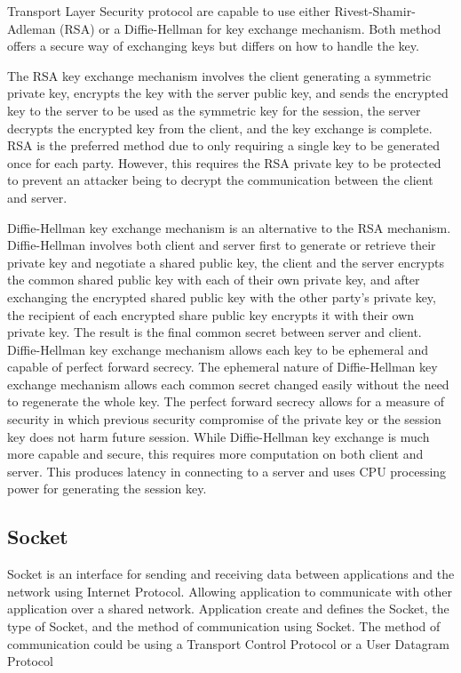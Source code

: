 Transport Layer Security protocol are capable to use either Rivest-Shamir-Adleman (RSA) or a Diffie-Hellman for key exchange mechanism. Both method offers a secure way of exchanging keys but differs on how to handle the key.

The RSA key exchange mechanism involves the client generating a symmetric private key, encrypts the key with the server public key, and sends the encrypted key to the server to be used as the symmetric key for the session, the server decrypts the encrypted key from the client, and the key exchange is complete. RSA is the preferred method due to only requiring a single key to be generated once for each party. However, this requires the RSA private key to be protected to prevent an attacker being to decrypt the communication between the client and server.



Diffie-Hellman key exchange mechanism is an alternative to the RSA mechanism. Diffie-Hellman involves both client and server first to generate or retrieve their private key and negotiate a shared public key, the client and the server encrypts the common shared public key with each of their own private key, and after exchanging the encrypted shared public key with the other party’s private key, the recipient of each encrypted share public key encrypts it with their own private key. The result is the final common secret between server and client. Diffie-Hellman key exchange mechanism allows each key to be ephemeral and capable of perfect forward secrecy. The ephemeral nature of Diffie-Hellman key exchange mechanism allows each common secret changed easily without the need to regenerate the whole key. The perfect forward secrecy allows for a measure of security in which previous security compromise of the private key or the session key does not harm future session. While Diffie-Hellman key exchange is much more capable and secure, this requires more computation on both client and server. This produces latency in connecting to a server and uses CPU processing power for generating the session key.
\subsection{Socket}
Socket is an interface for sending and receiving data between applications and the network using Internet Protocol. Allowing application to communicate with other application over a shared network. Application create and defines the Socket, the type of Socket, and the method of communication using Socket. The method of communication could be using a Transport Control Protocol or a User Datagram Protocol

